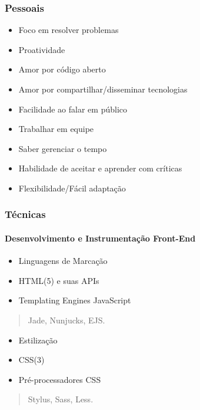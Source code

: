 \documentclass[]{article}
\providecommand{\tightlist}{%
  \setlength{\itemsep}{0pt}\setlength{\parskip}{0pt}}
\let\oldparagraph\paragraph
\renewcommand{\paragraph}[1]{\oldparagraph{#1}\mbox{}}
\begin{document}
\subsubsection{Pessoais}\label{pessoais}

\begin{itemize}
\tightlist
\item
  Foco em resolver problemas
\item
  Proatividade
\item
  Amor por código aberto
\item
  Amor por compartilhar/disseminar tecnologias
\item
  Facilidade ao falar em público
\item
  Trabalhar em equipe
\item
  Saber gerenciar o tempo
\item
  Habilidade de aceitar e aprender com críticas
\item
  Flexibilidade/Fácil adaptação
\end{itemize}

\subsubsection{Técnicas}\label{tuxe9cnicas}

\paragraph{Desenvolvimento e Instrumentação
Front-End}\label{desenvolvimento-e-instrumentauxe7uxe3o-front-end}

\begin{itemize}
\item
  Linguagens de Marcação
\item
  HTML(5) e suas APIs
\item
  Templating Engines JavaScript
\end{itemize}

\begin{quote}
Jade, Nunjucks, EJS.
\end{quote}

\begin{itemize}
\item
  Estilização
\item
  CSS(3)
\item
  Pré-processadores CSS
\end{itemize}

\begin{quote}
Stylus, Sass, Less.
\end{quote}
\end{document}
